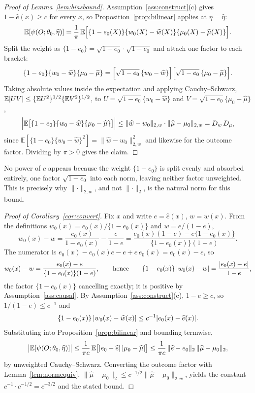\documentclass[11pt]{article}
\theoremstyle{plain}
\theoremstyle{definition}
\theoremstyle{remark}
\newcommand{\E}{\mathbb{E}}
\newcommand{\ez}{e_0}
\newcommand{\mz}{\mu_0}
\newcommand{\wz}{w_0}
\newcommand{\ehat}{\widehat{e}}
\newcommand{\mhat}{\widehat{\mu}}
\newcommand{\what}{\widehat{w}}
\newcommand{\Dw}{D_w}
\newcommand{\Dm}{D_\mu}
\newcommand{\Ltwo}[1]{\lVert #1 \rVert_{2}}
\newcommand{\Lw}[1]{\lVert #1 \rVert_{2,w}}
\DeclarePairedDelimiter{\abs}{\lvert}{\rvert}
\begin{document}
\begin{proof}[Proof of Lemma~\ref{lem:biasbound}]
Assumption~\ref{ass:construct}(c) gives $1-\ehat(x)\ge c$ for every $x$, so
Proposition~\ref{prop:bilinear} applies at $\eta=\widehat\eta$:
\[
  \E[\psi(O;\theta_0,\widehat\eta)]
  =\frac1\pi\,\E\Bigl[\{1-\ez(X)\}\{\wz(X)-\what(X)\}\{\mz(X)-\mhat(X)\}\Bigr].
\]
Split the weight as $\{1-\ez\}=\sqrt{1-\ez}\cdot\sqrt{1-\ez}$ and attach one
factor to each bracket:
\[
  \{1-\ez\}\{\wz-\what\}\{\mz-\mhat\}
  =\Bigl[\sqrt{1-\ez}\,\{\wz-\what\}\Bigr]
   \Bigl[\sqrt{1-\ez}\,\{\mz-\mhat\}\Bigr].
\]
Taking absolute values inside the expectation and applying Cauchy--Schwarz,
$\E\abs{UV}\le\{\E U^2\}^{1/2}\{\E V^2\}^{1/2}$, to
$U=\sqrt{1-\ez}\{\wz-\what\}$ and $V=\sqrt{1-\ez}\{\mz-\mhat\}$,
\[
  \Bigl\lvert\E\bigl[\{1-\ez\}\{\wz-\what\}\{\mz-\mhat\}\bigr]\Bigr\rvert
  \le\Lw{\what-\wz}\cdot\Lw{\mhat-\mz}=\Dw\,\Dm ,
\]
since $\E[\{1-\ez\}\{\wz-\what\}^2]=\Lw{\what-\wz}^2$ and likewise for the
outcome factor. Dividing by $\pi>0$ gives the claim.
\end{proof}

\noindent No power of $c$ appears because the weight $\{1-\ez\}$ is split evenly
and absorbed entirely, one factor $\sqrt{1-\ez}$ into each norm, leaving neither
factor unweighted. This is precisely why $\Lw\cdot$, and not $\Ltwo\cdot$, is the
natural norm for this bound.

\begin{proof}[Proof of Corollary~\ref{cor:convert}]
Fix $x$ and write $e=\ehat(x)$, $w=\what(x)$. From the definitions
$\wz(x)=\ez(x)/\{1-\ez(x)\}$ and $w=e/(1-e)$,
\[
  \wz(x)-w=\frac{\ez(x)}{1-\ez(x)}-\frac{e}{1-e}
  =\frac{\ez(x)(1-e)-e\{1-\ez(x)\}}{\{1-\ez(x)\}(1-e)} .
\]
The numerator is $\ez(x)-\ez(x)e-e+e\,\ez(x)=\ez(x)-e$, so
\[
  \wz(x)-w=\frac{\ez(x)-e}{\{1-\ez(x)\}(1-e)},
  \qquad\text{hence}\qquad
  \{1-\ez(x)\}\,\abs{\wz(x)-w}=\frac{\abs{\ez(x)-e}}{1-e},
\]
the factor $\{1-\ez(x)\}$ cancelling exactly; it is positive by
Assumption~\ref{ass:causal}. By Assumption~\ref{ass:construct}(c), $1-e\ge c$,
so $1/(1-e)\le c^{-1}$ and
\[
  \{1-\ez(x)\}\,\abs{\wz(x)-\what(x)}\le c^{-1}\abs{\ez(x)-\ehat(x)} .
\]
Substituting into Proposition~\ref{prop:bilinear} and bounding termwise,
\[
  \bigl\lvert\E[\psi(O;\theta_0,\widehat\eta)]\bigr\rvert
  \le\frac1{\pi c}\,\E\bigl[\abs{\ez-\ehat}\,\abs{\mz-\mhat}\bigr]
  \le\frac1{\pi c}\,\Ltwo{\ehat-\ez}\,\Ltwo{\mhat-\mz},
\]
by unweighted Cauchy--Schwarz. Converting the outcome factor with
Lemma~\ref{lem:normequiv}, $\Ltwo{\mhat-\mz}\le c^{-1/2}\Lw{\mhat-\mz}$, yields
the constant $c^{-1}\cdot c^{-1/2}=c^{-3/2}$ and the stated bound.
\end{proof}
\end{document}
